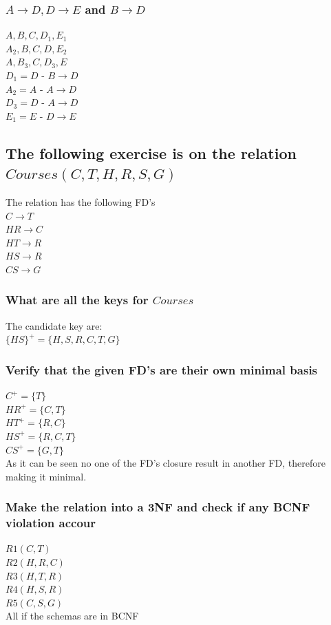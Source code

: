 \documentclass[12pt, a4paper]{article}
\begin{document}
					\subsubsection{$A\rightarrow D, D\rightarrow E$ and $B\rightarrow D$}
						$A,B,C,D_1,E_1$\\
						$A_2,B,C,D,E_2$\\
						$A,B_3,C,D_3,E$\\
						$D_1=D$ - $B\rightarrow D$\\
						$A_2=A$ - $A\rightarrow D$\\
						$D_3=D$ - $A\rightarrow D$\\
						$E_1=E$ - $D\rightarrow E$
				\subsection{The following exercise is on the relation $Courses(C,T,H,R,S,G)$}
					The relation has the following FD's\\
					$C\rightarrow T$\\
					$HR\rightarrow C$\\
					$HT\rightarrow R$\\
					$HS\rightarrow R$\\
					$CS\rightarrow G$
					\subsubsection{What are all the keys for $Courses$}
						The candidate key are:\\
						$\{HS\}^+=\{H,S,R,C,T,G\}$
					\subsubsection{Verify that the given FD's are their own minimal basis}
						$C^+=\{T\}$\\
						$HR^+=\{C,T\}$\\
						$HT^+=\{R,C\}$\\
						$HS^+=\{R,C,T\}$\\
						$CS^+=\{G,T\}$\\
						As it can be seen no one of the FD's closure result in another FD, therefore making it minimal.
					\subsubsection{Make the relation into a 3NF and check if any BCNF violation accour}
						$R1(C,T)$\\
						$R2(H,R,C)$\\
						$R3(H,T,R)$\\
						$R4(H,S,R)$\\
						$R5(C,S,G)$\\
						All if the schemas are in BCNF
		\clearpage
\end{document}

